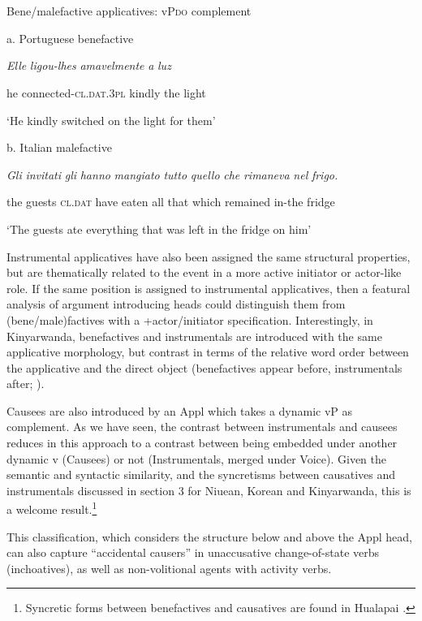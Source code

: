 \documentclass[output=paper,modfonts,nonflat]{langsci/langscibook}
\begin{document}
\ea%
    \label{ex:key:9}
    \gll\\
        \\
    \glt
    \z

             Bene/malefactive applicatives: vP\textsc{do} complement

a. Portuguese benefactive

  \textit{Elle} \textit{ligou-lhes}     \textit{amavelmente} \textit{a} \textit{luz}

  he   connected-\textsc{cl.dat.3pl} kindly   the light

  ‘He kindly switched on the light for them’

b. Italian malefactive

  \textit{Gli} \textit{invitati} \textit{gli} \textit{hanno} \textit{mangiato} \textit{tutto} \textit{quello} \textit{che} \textit{rimaneva} \textit{nel} \textit{frigo.} 

  the guests  \textsc{cl.dat}  have eaten all that which remained in-the fridge  

  ‘The guests ate everything that was left in the fridge on him’

Instrumental applicatives have also been assigned the same structural properties, but are thematically related to the event in a more active initiator or actor-like role. If the same position is assigned to instrumental applicatives, then a featural analysis of argument introducing heads could distinguish them from (bene/male)factives with a +actor/initiator specification. Interestingly, in Kinyarwanda, benefactives and instrumentals are introduced with the same applicative morphology, but contrast in terms of the relative word order between the applicative and the direct object (benefactives appear before, instrumentals after; \citealt{McGinnisGerdts2004}).

Causees are also introduced by an Appl which takes a dynamic vP as complement. As we have seen, the contrast between instrumentals and causees reduces in this approach to a contrast between being embedded under another dynamic v (Causees) or not (Instrumentals, merged under Voice). Given the semantic and syntactic similarity, and the syncretisms between causatives and instrumentals discussed in section 3 for Niuean, Korean and Kinyarwanda, this is a welcome result.\footnote{Syncretic forms between benefactives and causatives are found in Hualapai \citep{Peterson2007}.} 

This classification, which considers the structure below and above the Appl head, can also capture “accidental causers” in unaccusative change-of-state verbs (inchoatives), as well as non-volitional agents with activity verbs.  
\end{document}
